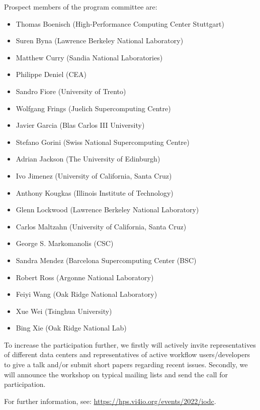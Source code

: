 \documentclass[a4paper,10pt]{article}
\begin{document}
Prospect members of the program committee are:
\begin{itemize}
 \item Thomas Boenisch (High-Performance Computing Center Stuttgart)
 \item Suren Byna (Lawrence Berkeley National Laboratory)
 \item Matthew Curry (Sandia National Laboratories)
 \item Philippe Deniel (CEA)
 \item Sandro Fiore (University of Trento)
 \item Wolfgang Frings (Juelich Supercomputing Centre)
 \item Javier Garcia (Blas Carlos III University)
 \item Stefano Gorini (Swiss National Supercomputing Centre)
 \item Adrian Jackson (The University of Edinburgh)
 \item Ivo Jimenez (University of California, Santa Cruz)
 \item Anthony Kougkas (Illinois Institute of Technology)
 \item Glenn Lockwood (Lawrence Berkeley National Laboratory)
 \item Carlos Maltzahn (University of California, Santa Cruz)
 \item George S. Markomanolis (CSC)
 \item Sandra Mendez (Barcelona Supercomputing Center (BSC)
 \item Robert Ross (Argonne National Laboratory)
 \item Feiyi Wang (Oak Ridge National Laboratory)
 \item Xue Wei (Tsinghua University)
 \item Bing Xie (Oak Ridge National Lab)
\end{itemize}

To increase the participation further, we firstly will actively invite representatives of different data centers and representatives of active workflow users/developers to give a talk and/or submit short papers regarding recent issues.
Secondly, we will announce the workshop on typical mailing lists and send the call for participation.


For further information, see:
\url{https://hps.vi4io.org/events/2022/iodc}.
\end{document}
